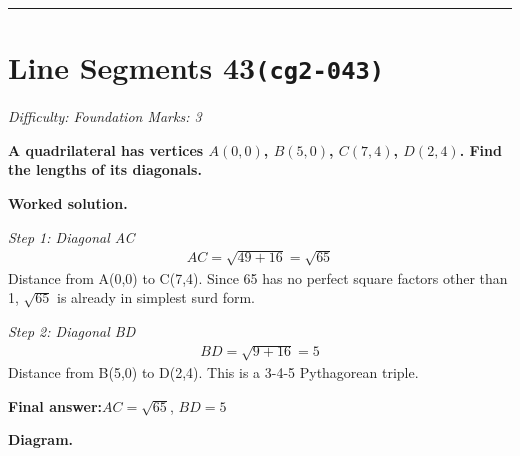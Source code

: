 \documentclass[11pt]{article}
\newcommand{\question}[1]{\par\medskip\noindent\textbf{#1}\par}
\begin{document}
\medskip\hrule

\section*{Line Segments 43\quad\small\texttt{(cg2-043)}}
\textit{Difficulty: Foundation \quad\textbar\quad Marks: 3}

\question{A quadrilateral has vertices \( A(0, 0) \), \( B(5, 0) \), \( C(7, 4) \), \( D(2, 4) \). Find the lengths of its diagonals.}

\textbf{Worked solution.}

\textit{Step 1: Diagonal AC}
\[\begin{gathered}
AC = \sqrt{49+16} = \sqrt{65}
\end{gathered}\]
Distance from A(0,0) to C(7,4). Since 65 has no perfect square factors other than 1, \(\sqrt{65}\) is already in simplest surd form.

\textit{Step 2: Diagonal BD}
\[\begin{gathered}
BD = \sqrt{9+16} = 5
\end{gathered}\]
Distance from B(5,0) to D(2,4). This is a 3-4-5 Pythagorean triple.

\begin{answerbox}
\textbf{Final answer:}\quad \(\displaystyle AC = \sqrt{65}\), \(\displaystyle BD = 5\)
\end{answerbox}
\textbf{Diagram.}
\end{document}
